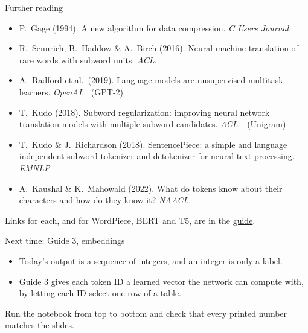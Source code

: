\documentclass[aspectratio=169,11pt,t,\primeropts]{beamer}
\begin{document}
\begin{frame}{Further reading}
  \small
  \begin{itemize}
    \item P.\ Gage (1994). A new algorithm for data compression. \emph{C Users Journal}.
    \item R.\ Sennrich, B.\ Haddow \& A.\ Birch (2016). Neural machine translation of rare words with
      subword units. \emph{ACL}.
    \item A.\ Radford et al.\ (2019). Language models are unsupervised multitask learners.
      \emph{OpenAI}. \ (GPT-2)
    \item T.\ Kudo (2018). Subword regularization: improving neural network translation models with
      multiple subword candidates. \emph{ACL}. \ (Unigram)
    \item T.\ Kudo \& J.\ Richardson (2018). SentencePiece: a simple and language independent subword
      tokenizer and detokenizer for neural text processing. \emph{EMNLP}.
    \item A.\ Kaushal \& K.\ Mahowald (2022). What do tokens know about their characters and how do
      they know it? \emph{NAACL}.
  \end{itemize}
  {\small\color{primerMuted}Links for each, and for WordPiece, BERT and T5, are in the
  \href{\guideurl}{guide}.}
\end{frame}

\begin{frame}{Next time: Guide 3, embeddings}
  \begin{itemize}
    \item Today's output is a sequence of integers, and an integer is only a label.
    \item Guide 3 gives each token ID a learned vector the network can compute with, by letting
      each ID select one row of a table.
  \end{itemize}
  \vspace{4mm}
  \begin{keyidea}
    Run the notebook from top to bottom and check that every printed number matches the slides.
  \end{keyidea}
\end{frame}
\end{document}
